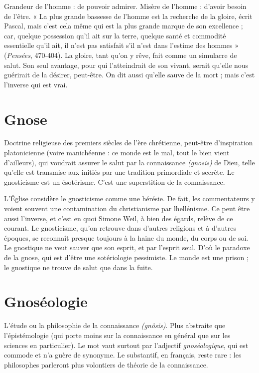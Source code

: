 Grandeur de l’homme : de pouvoir admirer. Misère de l’homme : d’avoir
besoin de l'être. « La plus grande bassesse de l’homme est la recherche de la
gloire, écrit Pascal, mais c’est cela même qui est la plus grande marque de son
excellence ; car, quelque possession qu’il ait sur la terre, quelque santé et commodité
essentielle qu’il ait, il n’est pas satisfait s’il n’est dans l'estime des
hommes » ({\it Pensées}, 470-404). La gloire, tant qu’on y rêve, fait comme un
simulacre de salut. Son seul avantage, pour qui l’atteindrait de son vivant, serait
qu’elle nous guérirait de la désirer, peut-être. On dit aussi qu’elle sauve de la
mort ; mais c’est l’inverse qui est vrai.

\section{Gnose}
Doctrine religieuse des premiers siècles de l’ère chrétienne, peut-être
d'inspiration platonicienne (voire manichéenne : ce monde est
le mal, tout le bien vient d’ailleurs), qui voudrait assurer le salut par la connaissance
{\it (gnosis)} de Dieu, telle qu’elle est transmise aux initiés par une tradition
primordiale et secrète. Le gnosticisme est un ésotérisme. C’est une superstition
de la connaissance.

L'Église considère le gnosticisme comme une hérésie. De fait, les commentateurs
y voient souvent une contamination du christianisme par lhellénisme.
Ce peut être aussi l'inverse, et c’est en quoi Simone Weil, à bien des égards,
relève de ce courant. Le gnosticisme, qu’on retrouve dans d’autres religions et
à d’autres époques, se reconnaît presque toujours à la haine du monde, du
corps ou de soi. Le gnostique ne veut sauver que son esprit, et par l'esprit seul.
D'où le paradoxe de la gnose, qui est d’être une sotériologie pessimiste. Le
monde est une prison ; le gnostique ne trouve de salut que dans la fuite.

\section{Gnoséologie}
L'étude ou la philosophie de la connaissance {\it (gnôsis)}. Plus
abstraite que l’épistémologie (qui porte moins sur la
connaissance en général que sur les sciences en particulier). Le mot vaut surtout
par l'adjectif {\it gnoséologique}, qui est commode et n’a guère de synonyme. Le
substantif, en français, reste rare : les philosophes parleront plus volontiers de
théorie de la connaissance.

